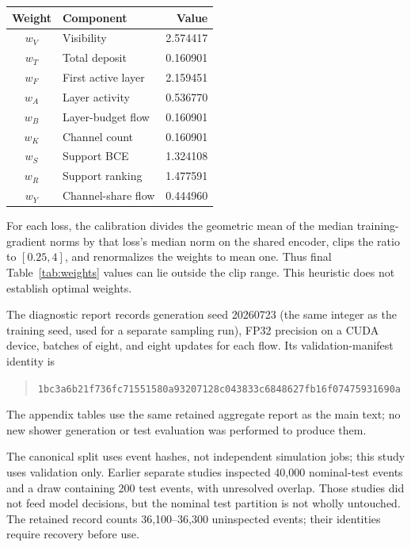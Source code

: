 \documentclass[10pt]{article}
\begin{document}
\begin{center}
\begin{minipage}{0.82\linewidth}
\centering
{}
\label{tab:weights}
\small
\begin{tabular}{@{}clr@{}}
\toprule
Weight & Component & Value \\
\midrule
$w_{V}$ & Visibility & 2.574417 \\
$w_{T}$ & Total deposit & 0.160901 \\
$w_{F}$ & First active layer & 2.159451 \\
$w_{A}$ & Layer activity & 0.536770 \\
$w_{B}$ & Layer-budget flow & 0.160901 \\
$w_{K}$ & Channel count & 0.160901 \\
$w_{S}$ & Support BCE & 1.324108 \\
$w_{R}$ & Support ranking & 1.477591 \\
$w_{Y}$ & Channel-share flow & 0.444960 \\
\bottomrule
\end{tabular}
\end{minipage}
\end{center}

For each loss, the calibration divides the geometric mean of the median training-gradient norms by that loss's median norm on the shared encoder, clips the ratio to $[0.25,4]$, and renormalizes the weights to mean one. Thus final Table~\ref{tab:weights} values can lie outside the clip range. This heuristic does not establish optimal weights.

The diagnostic report records generation seed 20260723 (the same integer as the training seed, used for a separate sampling run), FP32 precision on a CUDA device, batches of eight, and eight updates for each flow. Its validation-manifest identity is
\begin{quote}\footnotesize\nolinkurl{1bc3a6b21f736fc71551580a93207128c043833c6848627fb16f07475931690a}\end{quote}
The appendix tables use the same retained aggregate report as the main text; no new shower generation or test evaluation was performed to produce them.

The canonical split uses event hashes, not independent simulation jobs; this study uses validation only. Earlier separate studies inspected 40,000 nominal-test events and a draw containing 200 test events, with unresolved overlap. Those studies did not feed model decisions, but the nominal test partition is not wholly untouched. The retained record counts 36,100--36,300 uninspected events; their identities require recovery before use.
\end{document}
